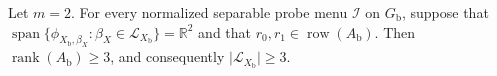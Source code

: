 Let \(m=2\).  For every normalized separable probe menu \(\mathcal I\) on
\(G_{\mathrm b}\), suppose that
\(\operatorname{span}\{\phi_{X_{\mathrm b},\beta_X}:\beta_X\in
\mathcal L_{X_{\mathrm b}}\}=\mathbb R^2\) and that
\(r_0,r_1\in\operatorname{row}(A_{\mathrm b})\).  Then
\(\operatorname{rank}(A_{\mathrm b})\ge3\), and consequently
\(\lvert\mathcal L_{X_{\mathrm b}}\rvert\ge3\).